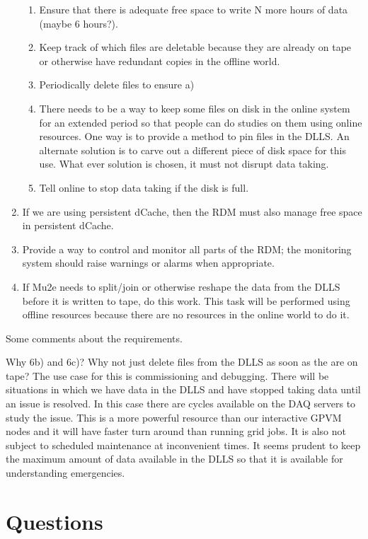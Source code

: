 \begin{enumerate}
  \begin{enumerate}
   \item Ensure that there is adequate free space to write N more hours of data (maybe 6 hours?).
   \item Keep track of which files are deletable because they are already on tape or otherwise have redundant copies in the offline world.
   \item Periodically delete files to ensure a)
   \item There needs to be a way to keep some files on disk in the online system for an extended period so that
     people can do studies on them using online resources. One way is to provide
     a method to pin files in the DLLS.  An alternate solution is to carve out a different piece of disk
     space for this use.
     What ever solution is chosen, it must not disrupt data taking.
   \item Tell online to stop data taking if the disk is full.
  \end{enumerate}
\item If we are using persistent dCache, then the RDM must also manage free space in persistent dCache.
\item Provide a way to control and monitor all parts of the RDM; the monitoring system should raise warnings or alarms when appropriate.
\item If Mu2e needs to split/join or otherwise reshape the data from the DLLS before it is written to tape, do this work.
  This task will be performed using offline resources because there are no resources in the online world to do it.
\end{enumerate}

Some comments about the requirements.

Why 6b) and 6c)?
Why not just delete files from the DLLS as soon as the are on tape?
The use case for this is commissioning and debugging.
There will be situations in which we have data in the DLLS and have stopped taking data
until an issue is resolved.
In this case there are cycles available on the DAQ servers to study the issue.
This is a more powerful resource than our interactive GPVM nodes and
it will have faster turn around than running grid jobs.
It is also not subject to scheduled maintenance at inconvenient times.
It seems prudent to keep the maximum amount of data available in the DLLS so that
it is available for understanding emergencies.

\chapter{Questions}
\label{ch:questions}

